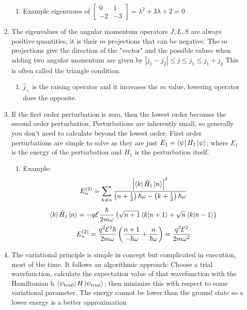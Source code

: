 \documentclass[english]{article}
\begin{document}
\begin{enumerate}
\begin{enumerate}
\item Example eigenvaues of $\begin{bmatrix}
0&1\\
-2&-3
\end{bmatrix}=\lambda^2+3\lambda+2=0$ 
\end{enumerate}
\item  The eigenvalues of the angular momentum operators $J, L, S$ are always positive quantities, it is their $m$ projections that can be negative. The $m$ projections give the direction of the "vector" and the possible values when adding two angular momentum are given by $|j_1-j_2|\leq j\leq j_1\leq j_1+j_2$ This is often called the triangle condition.
\begin{enumerate}
\item $\hat{j}_+$ is the raising operator and it increases the $m$ value, lowering operator does the opposite.
\end{enumerate}
\item  If the first order perturbation is zero, then the lowest order becomes the second order perturbation. Perturbations are inherently small, so generally you don't need to calculate beyond the lowest order. First order perturbations are simple to solve as they are just $E_1=\bra{\psi}H_1\ket{\psi}$; where $E_1$ is the energy of the perturbation and $H_1$ is the perturbation itself.
\begin{enumerate}
\item Example:
$$E^{(2)}_n=\sum_{k\neq n}\frac{\left|\bra{k}\hat{H}_1\ket{n}\right|^2}{\left(n+\frac{1}{2}\right)\hbar\omega-\left(k+\frac{1}{2}\right)\hbar\omega}$$
$$\bra{k}\hat{H}_1\ket{n}=-q\vb{\mathcal{E}}\frac{\hbar}{2m\omega}\left(\sqrt{n+1}\bra{k}\ket{n+1}+\sqrt{n}\bra{k}\ket{n-1}\right)$$
$$E^{(2)}_n=\frac{q^2\vb{\mathcal{E}}^2\hbar}{2m\omega}\left(\frac{n+1}{-\hbar\omega}+\frac{n}{\hbar\omega}\right)=\frac{q^2\vb{\mathcal{E}}^2}{2m\omega^2}$$
\end{enumerate}
\item  The variational principle is simple in concept but complicated in execution, most of the time. It follows an algorithmic approach: Choose a trial wavefunction, calculate the expectation value of that wavefunction with the Hamiltonian h $\bra{\psi_{\text{trial}}}H\ket{\psi_{\text{trial}}}$; then minimize this with respect to some variational parameter. The energy cannot be lower than the ground state so a lower energy is a better approximation
\begin{enumerate}

\end{enumerate}
\end{enumerate}
\end{document}
